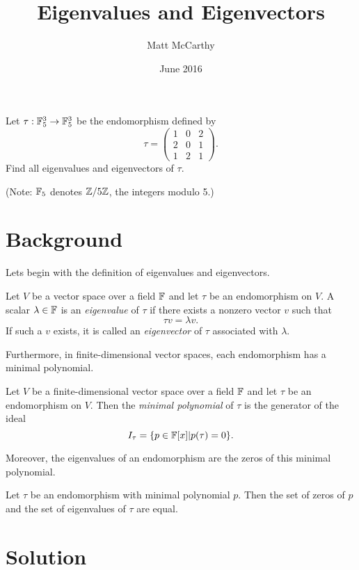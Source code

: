 \documentclass[notitlepage]{problem-solving}
\author{Matt McCarthy}
\date{June 2016}
\title{Eigenvalues and Eigenvectors}
\begin{document}
\maketitle

\begin{problem*}
	Let $\tau:\mathbb{F}_5^3\rightarrow\mathbb{F}_5^3$ be the endomorphism defined by
	\[
		\tau =
		\begin{pmatrix}
			1 & 0 & 2\\
			2 & 0 & 1\\
			1 & 2 & 1
		\end{pmatrix}.
	\]
	Find all eigenvalues and eigenvectors of $\tau$.

	(Note: $\mathbb{F}_5$ denotes $\mathbb{Z}/5\mathbb{Z}$, the integers modulo 5.)
\end{problem*}

\section{Background}

Lets begin with the definition of eigenvalues and eigenvectors.
\begin{definition}
	Let $V$ be a vector space over a field $\mathbb{F}$ and let $\tau$ be an endomorphism on $V$.
	A scalar $\lambda\in\mathbb{F}$ is an \textit{eigenvalue} of $\tau$ if there exists a nonzero vector $v$ such that
	\[
		\tau v =\lambda v.
	\]
	If such a $v$ exists, it is called an \textit{eigenvector} of $\tau$ associated with $\lambda$.
\end{definition}

Furthermore, in finite-dimensional vector spaces, each endomorphism has a minimal polynomial.
\begin{definition}
	Let $V$ be a finite-dimensional vector space over a field $\mathbb{F}$ and let $\tau$ be an endomorphism on $V$.
	Then the \textit{minimal polynomial} of $\tau$ is the generator of the ideal
	\[
		I_\tau = \lbrace p\in\mathbb{F}[x] | p(\tau) = 0 \rbrace.
	\]
\end{definition}

Moreover, the eigenvalues of an endomorphism are the zeros of this minimal polynomial.
\begin{thm}
	Let $\tau$ be an endomorphism with minimal polynomial $p$.
	Then the set of zeros of $p$ and the set of eigenvalues of $\tau$ are equal.
\end{thm}

\section{Solution}
\end{document}
